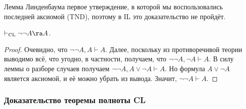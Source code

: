 \documentclass[a4paper,draft]{article}
\begin{document}
\begin{note}
  Лемма Линденбаума первое утверждение, в которой мы воспользовались последней аксиомой (TND),
  поэтому в IL это доказательство не пройдёт.
\end{note}



\begin{lemma}\label{lem:cl-negneg}
$\vdash_{\rm CL} \neg\neg A \ra A$.
\end{lemma}
\begin{proof}
  Очевидно, что $\neg\neg A, A \vdash A$.
  Далее, поскольку из противоречивой теории выводимо всё, что угодно, в частности, получаем, что $\neg\neg A, \neg A \vdash A$.
  В силу леммы о разборе случаев получаем $\neg \neg A, A \vee \neg A \vdash A$. Но формула $A \vee \neg A$ является аксиомой,
  и её можно убрать из вывода. Значит, $\neg\neg A \vdash A$.
\end{proof}

\subsubsection{Доказательство теоремы полноты CL}
\end{document}
